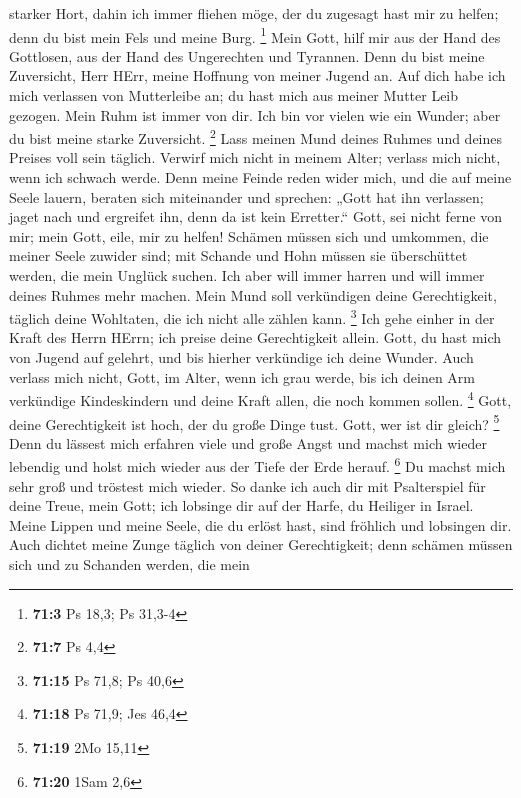 starker Hort, dahin ich immer fliehen möge, der du zugesagt hast mir zu
helfen; denn du bist mein Fels und meine Burg. \footnote{\textbf{71:3}
  Ps 18,3; Ps 31,3-4}  Mein Gott, hilf mir aus der Hand des
Gottlosen, aus der Hand des Ungerechten und Tyrannen.  Denn
du bist meine Zuversicht, Herr HErr, meine Hoffnung von meiner Jugend
an.  Auf dich habe ich mich verlassen von Mutterleibe an; du
hast mich aus meiner Mutter Leib gezogen. Mein Ruhm ist immer von dir.
 Ich bin vor vielen wie ein Wunder; aber du bist meine
starke Zuversicht. \footnote{\textbf{71:7} Ps 4,4}  Lass
meinen Mund deines Ruhmes und deines Preises voll sein täglich.
 Verwirf mich nicht in meinem Alter; verlass mich nicht,
wenn ich schwach werde.  Denn meine Feinde reden wider
mich, und die auf meine Seele lauern, beraten sich miteinander
 und sprechen: „Gott hat ihn verlassen; jaget nach und
ergreifet ihn, denn da ist kein Erretter.``  Gott, sei
nicht ferne von mir; mein Gott, eile, mir zu helfen! 
Schämen müssen sich und umkommen, die meiner Seele zuwider sind; mit
Schande und Hohn müssen sie überschüttet werden, die mein Unglück
suchen.  Ich aber will immer harren und will immer deines
Ruhmes mehr machen.  Mein Mund soll verkündigen deine
Gerechtigkeit, täglich deine Wohltaten, die ich nicht alle zählen kann.
\footnote{\textbf{71:15} Ps 71,8; Ps 40,6}  Ich gehe einher
in der Kraft des Herrn HErrn; ich preise deine Gerechtigkeit allein.
 Gott, du hast mich von Jugend auf gelehrt, und bis hierher
verkündige ich deine Wunder.  Auch verlass mich nicht,
Gott, im Alter, wenn ich grau werde, bis ich deinen Arm verkündige
Kindeskindern und deine Kraft allen, die noch kommen sollen. \footnote{\textbf{71:18}
  Ps 71,9; Jes 46,4}  Gott, deine Gerechtigkeit ist hoch,
der du große Dinge tust. Gott, wer ist dir gleich? \footnote{\textbf{71:19}
  2Mo 15,11}  Denn du lässest mich erfahren viele und große
Angst und machst mich wieder lebendig und holst mich wieder aus der
Tiefe der Erde herauf. \footnote{\textbf{71:20} 1Sam 2,6} 
Du machst mich sehr groß und tröstest mich wieder.  So
danke ich auch dir mit Psalterspiel für deine Treue, mein Gott; ich
lobsinge dir auf der Harfe, du Heiliger in Israel.  Meine
Lippen und meine Seele, die du erlöst hast, sind fröhlich und lobsingen
dir.  Auch dichtet meine Zunge täglich von deiner
Gerechtigkeit; denn schämen müssen sich und zu Schanden werden, die mein
